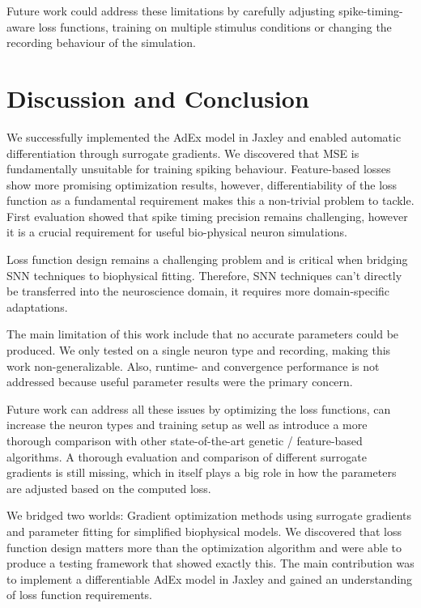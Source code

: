 \documentclass[conference]{IEEEtran}
\begin{document}
Future work could address these limitations by carefully adjusting spike-timing-aware loss functions, training on multiple stimulus conditions or changing the recording behaviour of the simulation.

\section{Discussion and Conclusion}\label{sec:discussion}
We successfully implemented the \ac{AdEx} model in Jaxley and enabled automatic differentiation through surrogate gradients.
We discovered that \ac{MSE} is fundamentally unsuitable for training spiking behaviour.
Feature-based losses show more promising optimization results, however, differentiability of the loss function as a fundamental requirement makes this a non-trivial problem to tackle.
First evaluation showed that spike timing precision remains challenging, however it is a crucial requirement for useful bio-physical neuron simulations.

Loss function design remains a challenging problem and is critical when bridging \ac{SNN} techniques to biophysical fitting.
Therefore, \ac{SNN} techniques can't directly be transferred into the neuroscience domain, it requires more domain-specific adaptations.

The main limitation of this work include that no accurate parameters could be produced.
We only tested on a single neuron type and recording, making this work non-generalizable.
Also, runtime- and convergence performance is not addressed because useful parameter results were the primary concern.

Future work can address all these issues by optimizing the loss functions,
can increase the neuron types and training setup as well as introduce a more thorough comparison with other state-of-the-art genetic / feature-based algorithms.
A thorough evaluation and comparison of different surrogate gradients is still missing, which in itself plays a big role in how the parameters are adjusted based on the computed loss.

We bridged two worlds: Gradient optimization methods using surrogate gradients and parameter fitting for simplified biophysical models.
We discovered that loss function design matters more than the optimization algorithm and were able to produce a testing framework that showed exactly this.
The main contribution was to implement a differentiable AdEx model in Jaxley and gained an understanding of loss function requirements.
\end{document}
